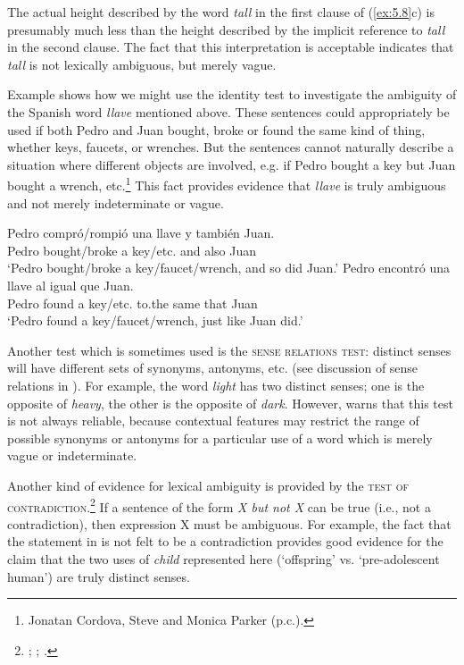 The actual height described by the word \textit{tall} in the first clause of (\ref{ex:5.8}c) is presumably much less than the height described by the implicit reference to \textit{tall} in the second clause. The fact that this interpretation is acceptable indicates that \textit{tall} is not lexically ambiguous, but merely vague.



Example  shows how we might use the identity test to investigate the ambiguity of the Spanish word \textit{llave} mentioned above. These sentences could appropriately be used if both Pedro and Juan bought, broke or found the same kind of thing, whether keys, faucets, or wrenches. But the sentences cannot naturally describe a situation where different objects are involved, e.g. if Pedro bought a key but Juan bought a wrench, etc.\footnote{Jonatan Cordova, Steve and Monica Parker (p.c.).} This fact provides evidence that \textit{llave} is truly ambiguous and not merely indeterminate or vague.


\ea \label{ex:5.9}
\ea  \gll Pedro  compró/rompió  una  llave  y  también  Juan.\\
Pedro  bought/broke  a  key/etc.  and  also  Juan\\
\glt ‘Pedro bought/broke a key/faucet/wrench, and so did Juan.’
\ex \gll  Pedro  encontró  una  llave  al  igual  que  Juan.\\
Pedro  found  a  key/etc.  to.the  same  that  Juan\\
\glt ‘Pedro found a key/faucet/wrench, just like Juan did.’
\z \z


Another test which is sometimes used is the \textsc{sense relations test}: distinct senses will have different sets of synonyms, antonyms, etc. (see discussion of sense relations in ). For example, the word \textit{light} has two distinct senses; one is the opposite of \textit{heavy}, the other is the opposite of \textit{dark}. However, \citet[56-57]{Cruse1986} warns that this test is not always reliable, because contextual features may restrict the range of possible synonyms or antonyms for a particular use of a word which is merely vague or indeterminate.



Another kind of evidence for lexical ambiguity is provided by the \textsc{test of contradiction}.\footnote{\citet{Quine1960}; \citet{ZwickySadock1975}; \citet{Kennedy2011}.} If a sentence of the form \textit{X but not X} can be true (i.e., not a contradiction), then expression X must be ambiguous. For example, the fact that the statement in  is not felt to be a contradiction provides good evidence for the claim that the two uses of \textit{child} represented here (‘offspring’ vs. ‘pre-adolescent human’) are truly distinct senses.


